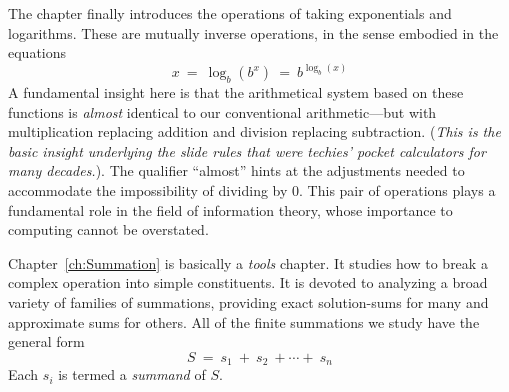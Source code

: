 \smallskip


The chapter finally introduces the operations of taking exponentials and logarithms.  These are mutually inverse operations, in the sense embodied in the equations
\[  x \ = \ \log_b(b^x) \ = \ b^{\log_b(x)} \]
A fundamental insight here is that the arithmetical system based on these functions is {\em almost} identical to our conventional arithmetic---but with multiplication replacing addition and division replacing subtraction.  ({\em This is the basic insight underlying the {\em slide rules} that were techies' pocket calculators for many decades.}). The qualifier ``almost'' hints at the adjustments needed to accommodate the impossibility of dividing by $0$.  This pair of operations plays a fundamental role in the field of information theory, whose importance to computing cannot be overstated.

\bigskip

 

Chapter~\ref{ch:Summation} is basically a {\em tools} chapter.  It studies how to break a complex operation into simple constituents. It is devoted to analyzing a broad variety of families of summations, providing exact solution-sums for many and approximate sums for others.  All of the finite summations we study have the general form
\begin{equation}
\label{eq:summation-defn}
S \ = \ s_1 \ + \ s_2 \ + \cdots + \ s_n
\end{equation}
Each $s_i$ is termed a {\it summand} of $S$.

\bigskip

\noindent {}

\bigskip

 

